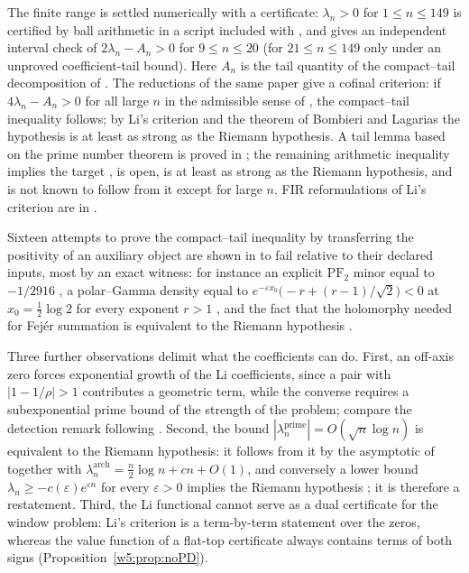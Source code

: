 \documentclass[11pt]{amsart}
\theoremstyle{definition}
\theoremstyle{remark}
\numberwithin{equation}{section}
\begin{document}
The finite range is settled numerically with a certificate: $\lambda_n>0$ for $1\le n\le149$ is
certified by ball arithmetic in a script included with \cite{P37}, and
\cite[Proposition~9.137]{P36} gives an independent interval check of $2\lambda_n-A_n>0$ for
$9\le n\le20$ (for $21\le n\le149$ only under an unproved coefficient-tail bound). Here $A_n$ is the
tail quantity of the compact--tail decomposition of \cite[Theorem~2.3]{P37}. The reductions of the
same paper give a cofinal criterion: if $4\lambda_n-A_n>0$ for all large $n$ in the admissible
sense of \cite[Theorem~2.10]{P37}, the compact--tail inequality follows; by Li's criterion and
the theorem of Bombieri and Lagarias the hypothesis is at least as strong as the Riemann hypothesis. A tail
lemma based on the prime number theorem is proved in \cite[Lemma~9.132]{P36}; the remaining
arithmetic inequality implies the target \cite[Theorem~9.135 and Corollary~9.136]{P36}, is open,
is at least as strong as the Riemann hypothesis, and is not known to follow from it except for
large $n$. FIR reformulations of Li's criterion are in \cite[Theorems~3.1 and 4.1]{P38}.

Sixteen attempts to prove the compact--tail inequality by transferring the positivity of an
auxiliary object are shown in \cite{P37} to fail relative to their declared inputs, most by an
exact witness: for instance an explicit $\mathrm{PF}_2$ minor equal to $-1/2916$
\cite[Theorem~6.1 and Witness~6.1]{P37}, a polar--Gamma density equal to
$e^{-\varepsilon x_0}\bigl(-r+(r-1)/\sqrt2\bigr)<0$ at $x_0=\frac12\log2$ for every exponent $r>1$
\cite[Theorem~12.1]{P37}, and the fact that the holomorphy needed for Fej\'er summation is
equivalent to the Riemann hypothesis \cite[Theorems~8.3 and 8.4]{P37}.

Three further observations delimit what the coefficients can do. First, an off-axis zero forces
exponential growth of the Li coefficients, since a pair with $|1-1/\rho|>1$ contributes a geometric
term, while the converse requires a subexponential prime bound of the strength of the problem;
compare the detection remark following \cite[Lemma~9.121]{P36}. Second, the bound
$|\lambda_n^{\mathrm{prime}}|=O(\sqrt n\log n)$ is equivalent to the Riemann hypothesis: it
follows from it by the asymptotic of \cite{BombieriLagarias1999} together with
$\lambda_n^{\mathrm{arch}}=\frac n2\log n+cn+O(1)$, and conversely a lower bound
$\lambda_n\ge-c(\varepsilon)e^{\varepsilon n}$ for every $\varepsilon>0$ implies the Riemann
hypothesis \cite{BombieriLagarias1999}; it is therefore a restatement. Third, the Li functional
cannot serve as a dual certificate for the window problem: Li's criterion is a term-by-term
statement over the zeros, whereas the value function of a flat-top certificate always contains
terms of both signs (Proposition~\ref{w5:prop:noPD}).
\end{document}
